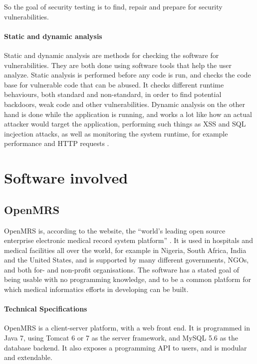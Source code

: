 \documentclass{report} %
\begin{document}
  So the goal of security testing is to find, repair and prepare for security
  vulnerabilities.
  
  \paragraph{Static and dynamic analysis}

  Static and dynamic analysis are methods for checking the software for vulnerabilities.
  They are both done using software tools that help the user analyze. Static
  analysis is performed before any code is run, and checks the code base for
  vulnerable code that can be abused. It checks different runtime behaviours,
  both standard and non-standard, in order to find potential backdoors, weak
  code and other vulnerabilities. Dynamic analysis on the other hand is done
  while the application is running, and works a lot like how an actual attacker
  would target the application, performing such things as XSS and SQL incjection
  attacks, as well as monitoring the system runtime, for example performance and
  HTTP requests \autocite[]{VERACODE}.

\newpage
\section{Software involved}
  
\subsection{OpenMRS}

  OpenMRS is, according to the website, the ``world's leading open source
  enterprise electronic medical record system platform'' \autocite[]{OpenMRSAbout}. It is used in
  hospitals and medical facilities all over the world, for example in Nigeria, South Africa, India
  and the United States, and is supported by many different governments, NGOs,
  and both for- and non-profit organisations. The software has a stated goal of
  being usable with no programming knowledge, and to be a common platform for
  which medical informatics efforts in developing can be built.

  \paragraph{Technical Specifications}

  OpenMRS is a client-server platform, with a web front end. It is programmed in
  Java 7, using Tomcat 6 or 7 as the server framework, and MySQL 5.6 as the
  database backend. It also exposes a programming API to users, and is modular
  and extendable.
\end{document}
